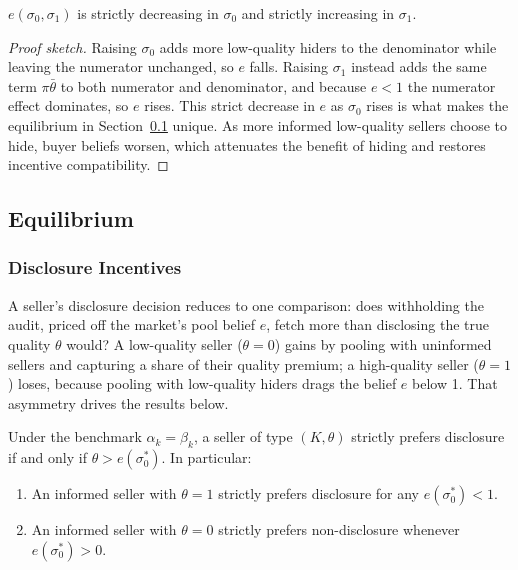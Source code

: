 \begin{lemma}\label{lem:belief_monotone}
$e(\sigma_0,\sigma_1)$ is strictly decreasing in $\sigma_0$ and strictly increasing in $\sigma_1$.
\end{lemma}
\begin{proof}[Proof sketch]
Raising $\sigma_0$ adds more low-quality hiders to the denominator while leaving the numerator unchanged, so $e$ falls. Raising $\sigma_1$ instead adds the same term $\pi\bar{\theta}$ to both numerator and denominator, and because $e < 1$ the numerator effect dominates, so $e$ rises. This strict decrease in $e$ as $\sigma_0$ rises is what makes the equilibrium in Section~\ref{sec:equilibrium} unique. As more informed low-quality sellers choose to hide, buyer beliefs worsen, which attenuates the benefit of hiding and restores incentive compatibility.
\end{proof}

\subsection{Equilibrium}
\label{sec:equilibrium}

\subsubsection{Disclosure Incentives}

A seller's disclosure decision reduces to one comparison: does withholding the audit, priced off the market's pool belief $e$, fetch more than disclosing the true quality $\theta$ would? A low-quality seller ($\theta=0$) gains by pooling with uninformed sellers and capturing a share of their quality premium; a high-quality seller ($\theta=1$) loses, because pooling with low-quality hiders drags the belief $e$ below 1. That asymmetry drives the results below.

\begin{proposition}
\label{prop:premium}
Under the benchmark $\alpha_k=\beta_k$, a seller of type $(K,\theta)$ strictly prefers disclosure if and only if $\theta > e(\sigma_0^*)$. In particular:
\begin{enumerate}[label=(\roman*)]
    \item An informed seller with $\theta=1$ strictly prefers disclosure for any $e(\sigma_0^*)<1$.
    \item An informed seller with $\theta=0$ strictly prefers non-disclosure whenever $e(\sigma_0^*)>0$.
\end{enumerate}
\end{proposition}

